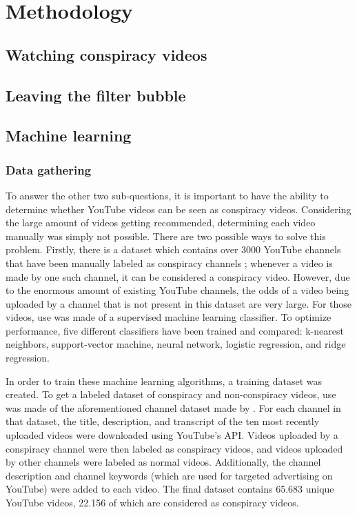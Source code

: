 \documentclass[../main.tex]{subfiles}
\begin{document}
\section{Methodology}
\subsection{Watching conspiracy videos}

\subsection{Leaving the filter bubble}

\subsection{Machine learning}
\subsubsection{Data gathering}
To answer the other two sub-questions, it is important to have the ability to determine whether YouTube videos can be seen as conspiracy videos. Considering the large amount of videos getting recommended, determining each video manually was simply not possible. There are two possible ways to solve this problem. Firstly, there is a dataset which contains over 3000 YouTube channels that have been manually labeled as conspiracy channels \citep{ledwich2019algorithmic}; whenever a video is made by one such channel, it can be considered a conspiracy video. However, due to the enormous amount of existing YouTube channels, the odds of a video being uploaded by a channel that is not present in this dataset are very large. For those videos, use was made of a supervised machine learning classifier. To optimize performance, five different classifiers have been trained and compared: k-nearest neighbors, support-vector machine, neural network, logistic regression, and ridge regression. 

In order to train these machine learning algorithms, a training dataset was created. To get a labeled dataset of conspiracy and non-conspiracy videos, use was made of the aforementioned channel dataset made by \citet{ledwich2019algorithmic}. For each channel in that dataset, the title, description, and transcript of the ten most recently uploaded videos were downloaded using YouTube's API. Videos uploaded by a conspiracy channel were then labeled as conspiracy videos, and videos uploaded by other channels were labeled as normal videos. Additionally, the channel description and channel keywords (which are used for targeted advertising on YouTube) were added to each video. The final dataset contains 65.683 unique YouTube videos, 22.156 of which are considered as conspiracy videos. 
\end{document}
